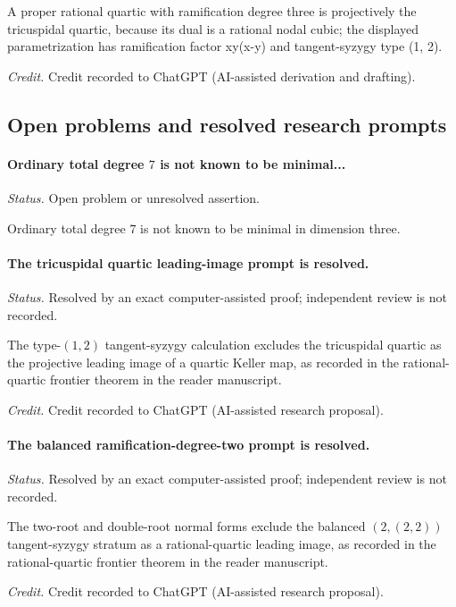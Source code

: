 A proper rational quartic with ramification degree three is projectively the tricuspidal quartic, because its dual is a rational nodal cubic; the displayed parametrization has ramification factor xy(x-y) and tangent-syzygy type (1, 2).

\emph{Credit.} Credit recorded to ChatGPT (AI-assisted derivation and drafting).

\subsection{Open problems and resolved research prompts}

\label{supp-note-02-027}
\paragraph{Ordinary total degree \(7\) is not known to be minimal...}
\emph{Status.} Open problem or unresolved assertion.

Ordinary total degree \(7\) is not known to be minimal in dimension three.

\label{supp-note-02-028}
\paragraph{The tricuspidal quartic leading-image prompt is resolved.}
\emph{Status.} Resolved by an exact computer-assisted proof; independent
review is not recorded.

The type-\((1,2)\) tangent-syzygy calculation excludes the tricuspidal
quartic as the projective leading image of a quartic Keller map, as recorded
in the rational-quartic frontier theorem in the reader manuscript.

\emph{Credit.} Credit recorded to ChatGPT (AI-assisted research proposal).

\label{supp-note-02-029}
\paragraph{The balanced ramification-degree-two prompt is resolved.}
\emph{Status.} Resolved by an exact computer-assisted proof; independent
review is not recorded.

The two-root and double-root normal forms exclude the balanced
\((2,(2,2))\) tangent-syzygy stratum as a rational-quartic leading image,
as recorded in the rational-quartic frontier theorem in the reader
manuscript.

\emph{Credit.} Credit recorded to ChatGPT (AI-assisted research proposal).

